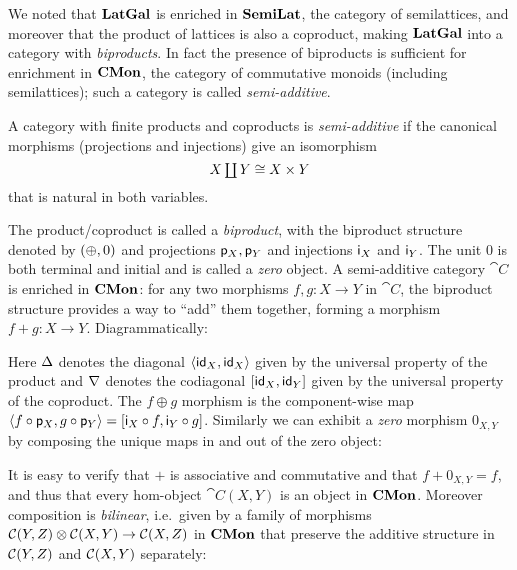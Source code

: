 We noted that $\mathbf{LatGal}$ is enriched in $\mathbf{SemiLat}$, the category of semilattices, and moreover that the product
of lattices is also a coproduct, making $\mathbf{LatGal}$ into a category with \emph{biproducts}. In fact the presence
of biproducts is sufficient for enrichment in $\mathbf{CMon}$, the category of commutative monoids (including
semilattices); such a category is called \emph{semi-additive}.

\begin{definition}
\label{def:biproducts:semi-additive}
A category with finite products and coproducts is \emph{semi-additive} if the canonical morphisms (projections
and injections) give an isomorphism
\[\textstyle X \coprod Y \cong X \times Y\] that is natural in both variables.
\end{definition}

The product/coproduct is called a \emph{biproduct}, with the biproduct structure denoted by $(\oplus, 0)$ and
projections $\mathsf{p}_X, \mathsf{p}_Y$ and injections $\mathsf{i}_X$ and $\mathsf{i}_Y$. The unit $0$ is both terminal and
initial and is called a \emph{zero} object. A semi-additive category $\cat{C}$ is enriched in $\mathbf{CMon}$: for any
two morphisms $f, g: X \to Y$ in $\cat{C}$, the biproduct structure provides a way to ``add'' them together,
forming a morphism $f + g: X \to Y$. Diagrammatically:

\begin{center}
\end{center}

Here $\Delta$ denotes the diagonal $\langle \mathsf{id}_X, \mathsf{id}_X\rangle$ given by the universal property of the product and
$\nabla$ denotes the codiagonal $[\mathsf{id}_X, \mathsf{id}_Y]$ given by the universal property of the coproduct.
The $f \oplus g$ morphism is the component-wise map $\langle f \circ \mathsf{p}_X, g \circ \mathsf{p}_Y\rangle =
[\mathsf{i}_X \circ f, \mathsf{i}_Y \circ g]$. Similarly we can exhibit a \emph{zero} morphism $0_{X,Y}$ by
composing the unique maps in and out of the zero object:

\begin{center}
\end{center}

It is easy to verify that $+$ is associative and commutative and that $f + 0_{X,Y} = f$, and thus that every
hom-object $\cat{C}(X,Y)$ is an object in $\mathbf{CMon}$. Moreover composition is \emph{bilinear}, i.e.~given by a
family of morphisms ${\mathcal{C}}(Y,Z) \otimes {\mathcal{C}}(X,Y) \to {\mathcal{C}}(X,Z)$ in $\mathbf{CMon}$ that
preserve the additive structure in ${\mathcal{C}}(Y,Z)$ and ${\mathcal{C}}(X,Y)$ separately:

